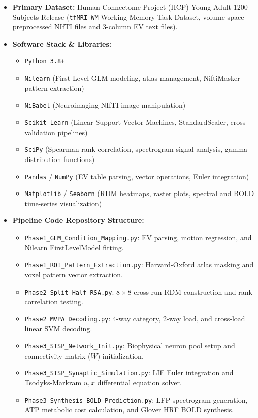 \documentclass[11pt,a4paper]{article}
\begin{document}
\begin{itemize}
    \item \textbf{Primary Dataset:} Human Connectome Project (HCP) Young Adult 1200 Subjects Release (\texttt{tfMRI\_WM} Working Memory Task Dataset, volume-space preprocessed NIfTI files and 3-column EV text files).
    \item \textbf{Software Stack \& Libraries:}
    \begin{itemize}
        \item \texttt{Python 3.8+}
        \item \texttt{Nilearn} (First-Level GLM modeling, atlas management, NiftiMasker pattern extraction)
        \item \texttt{NiBabel} (Neuroimaging NIfTI image manipulation)
        \item \texttt{Scikit-Learn} (Linear Support Vector Machines, StandardScaler, cross-validation pipelines)
        \item \texttt{SciPy} (Spearman rank correlation, spectrogram signal analysis, gamma distribution functions)
        \item \texttt{Pandas} / \texttt{NumPy} (EV table parsing, vector operations, Euler integration)
        \item \texttt{Matplotlib} / \texttt{Seaborn} (RDM heatmaps, raster plots, spectral and BOLD time-series visualization)
    \end{itemize}
    \item \textbf{Pipeline Code Repository Structure:}
    \begin{itemize}
        \item \texttt{Phase1\_GLM\_Condition\_Mapping.py}: EV parsing, motion regression, and Nilearn FirstLevelModel fitting.
        \item \texttt{Phase1\_ROI\_Pattern\_Extraction.py}: Harvard-Oxford atlas masking and voxel pattern vector extraction.
        \item \texttt{Phase2\_Split\_Half\_RSA.py}: $8 \times 8$ cross-run RDM construction and rank correlation testing.
        \item \texttt{Phase2\_MVPA\_Decoding.py}: 4-way category, 2-way load, and cross-load linear SVM decoding.
        \item \texttt{Phase3\_STSP\_Network\_Init.py}: Biophysical neuron pool setup and connectivity matrix ($W$) initialization.
        \item \texttt{Phase3\_STSP\_Synaptic\_Simulation.py}: LIF Euler integration and Tsodyks-Markram $u, x$ differential equation solver.
        \item \texttt{Phase3\_Synthesis\_BOLD\_Prediction.py}: LFP spectrogram generation, ATP metabolic cost calculation, and Glover HRF BOLD synthesis.
    \end{itemize}
\end{itemize}
\end{document}
